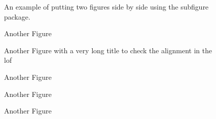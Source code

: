 \documentclass[msc,oneside]{ubcthesis}%
\begin{document}
\begin{figure}
	\centering


	\caption{An example of putting two figures side by side using the subfigure package.}
	\label{ref:ex-ppa-l1-linf}
\end{figure}

\begin{figure}%
\caption{Another Figure}%
\end{figure}

\begin{figure}%
\caption{Another Figure with a very long title to check the alignment in the lof}%
\end{figure}

\begin{figure}%
\caption{Another Figure}%
\end{figure}

\begin{figure}%
\caption{Another Figure}%
\end{figure}

\begin{figure}%
\caption{Another Figure}%
\end{figure}
\end{document}
